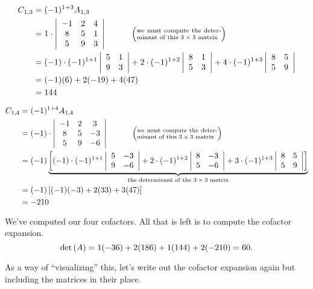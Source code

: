 {\begin{align*}C_{1,3} &= (-1)^{1+3}\tta_{1,3}\\
	&= 1\cdot\bdt{ccc}-1&2&4\\8&5&1\\5&9&3\edt \quad\quad\quad \left(\parbox{100pt}{\scriptsize we must compute the determinant of this $3\times 3$ matrix}\right)\\
	&= (-1)\cdot(-1)^{1+1}\bdt{cc}5&1\\9&3\edt + 2\cdot(-1)^{1+2}\bdt{cc}8&1\\5&3\edt + 4\cdot(-1)^{1+3}\bdt{cc}8&5\\5&9\edt \\
	&= (-1)(6)+2(-19)+4(47)\\
	&= 144
\end{align*}

\begin{align*}C_{1,4} &= (-1)^{1+4}\tta_{1,4}\\
	&= (-1)\cdot\bdt{ccc}-1&2&3\\8&5&-3\\5&9&-6\edt \quad\quad\quad \left(\parbox{100pt}{\scriptsize we must compute the determinant of this $3\times 3$ matrix}\right)\\
	&= (-1)\underbrace{\left[(-1)\cdot(-1)^{1+1}\bdt{cc}5&-3\\9&-6\edt + 2\cdot(-1)^{1+2}\bdt{cc}8&-3\\5&-6\edt + 3\cdot(-1)^{1+3}\bdt{cc}8&5\\5&9\edt\right]}_{\parbox{150pt}{\centering\scriptsize the determinant of the $3 \times 3$ matrix}} \\
	&= (-1)\left[(-1)(-3)+2(33)+3(47)\right]\\
	&= -210
\end{align*}

We've computed our four cofactors. All that is left is to compute the cofactor expansion.
$$\text{det}\left(A\right) = 1(-36) + 2(186)+1(144)+2(-210) = 60.$$

As a way of ``visualizing'' this, let's write out the cofactor expansion again but including the matrices in their place. 

}
